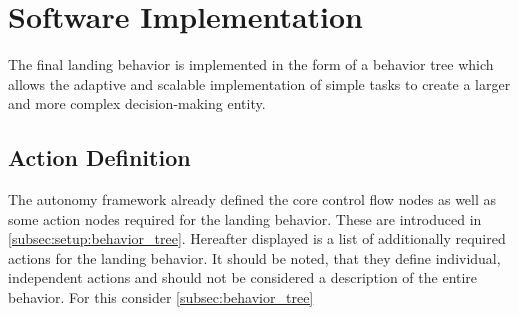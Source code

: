 \section{Software Implementation}\label{sec:landing_impl}

The final landing behavior is implemented in the form of a behavior tree which allows the adaptive and scalable implementation of simple tasks to create a larger and more complex decision-making entity.

\subsection{Action Definition}\label{subsec:actn_def}

The autonomy framework already defined the core control flow nodes as well as some action nodes required for the landing behavior. These are introduced in \cref{subsec:setup:behavior_tree}. Hereafter displayed is a list of additionally required actions for the landing behavior. It should be noted, that they define individual, independent actions and should not be considered a description of the entire behavior. For this consider \cref{subsec:behavior_tree}

